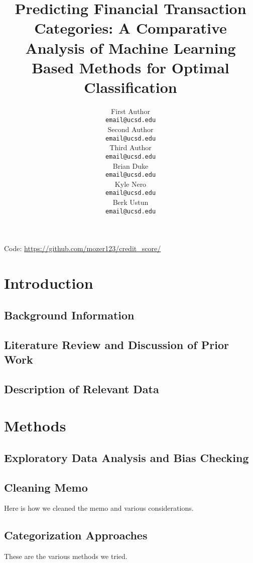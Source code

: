 \documentclass[12pt,letterpaper]{article}
\title{Predicting Financial Transaction Categories: A Comparative Analysis of Machine Learning Based Methods for Optimal Classification}
\author{First Author \\
  {\tt email@ucsd.edu} \\\And
  Second Author \\
  {\tt email@ucsd.edu} \\\And
  Third Author \\
  {\tt email@ucsd.edu} \\\And
  Brian Duke \\
  {\tt email@ucsd.edu} \\\And
  Kyle Nero \\
  {\tt email@ucsd.edu} \\\And
  Berk Ustun \\
  {\tt email@ucsd.edu} \\
}
\begin{document}
\maketitle



\begin{abstract}
    \textcolor{LightGrey}{\lipsum[1]}
\end{abstract}

\begin{center}
Code: \url{https://github.com/mozer123/credit_score/}
\end{center}

\maketoc
\clearpage


\section{Introduction}
\subsection{Background Information}
\subsection{Literature Review and Discussion of Prior Work}
\subsection{Description of Relevant Data}

\section{Methods}
\subsection{Exploratory Data Analysis and Bias Checking}
\subsection{Cleaning Memo}
Here is how we cleaned the memo and various considerations.
\subsection{Categorization Approaches}
These are the various methods we tried.
\end{document}

